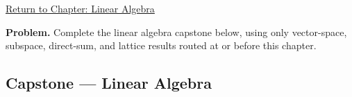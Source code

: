 \newpage
{}
\label{cap:linear-algebra}

\begin{remark*}[Return]
\hyperref[chap:linear-algebra]{Return to Chapter: Linear Algebra}
\end{remark*}

\begin{tcolorbox}[
  colback=gray!6,
  colframe=gray!40,
  arc=2pt,
  left=8pt, right=8pt, top=6pt, bottom=6pt,
  title={\small\textbf{Capstone Problem}},
  fonttitle=\small\bfseries
]
\textbf{Problem.}
Complete the linear algebra capstone below, using only vector-space,
subspace, direct-sum, and lattice results routed at or before this chapter.
\end{tcolorbox}

\subsection*{Capstone --- Linear Algebra}

